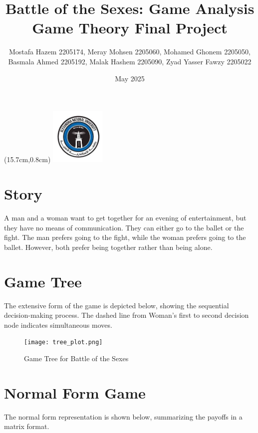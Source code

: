\documentclass[a4paper,12pt]{article}
\begin{document}
\title{\textbf{Battle of the Sexes: Game Analysis\\
    \small Game Theory Final Project}}

\author{Mostafa Hazem 2205174, Meray Mohsen 2205060, Mohamed Ghonem 2205050, \\ 
Basmala Ahmed 2205192, Malak Hashem 2205090, Zyad Yasser Fawzy 2205022}
\date{May 2025}
\maketitle

\begin{textblock*}{3cm}(15.7cm,0.8cm)
    \includegraphics[width=2.625cm]{ANU_LOGO.jpg}
\end{textblock*}

\section{Story}
A man and a woman want to get together for an evening of entertainment, but they have no means of communication. They can either go to the ballet or the fight. The man prefers going to the fight, while the woman prefers going to the ballet. However, both prefer being together rather than being alone.


\section{Game Tree}
The extensive form of the game is depicted below, showing the sequential decision-making process. The dashed line from Woman's first to second decision node indicates simultaneous moves.

\begin{figure}[H]
\centering
\texttt{[image: tree\_plot.png]}
\caption{Game Tree for Battle of the Sexes}
\end{figure}

\section{Normal Form Game}
The normal form representation is shown below, summarizing the payoffs in a matrix format.
\end{document}

